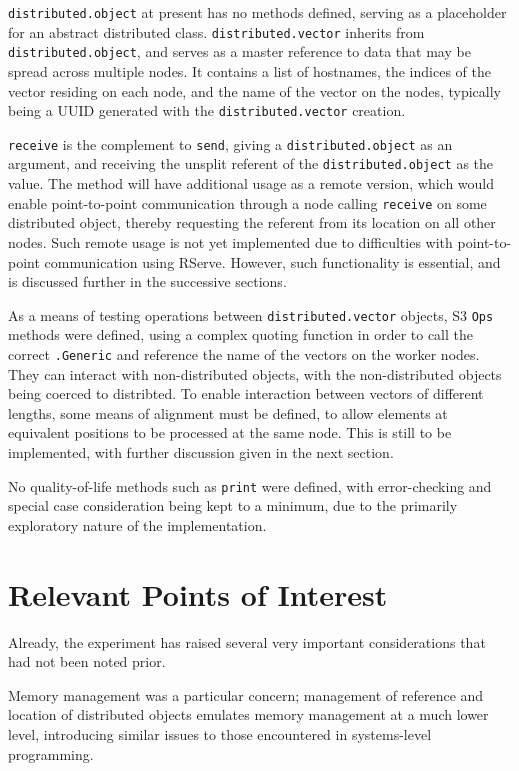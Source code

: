 \documentclass[a4paper,10pt]{article}
\begin{document}
\texttt{distributed.object} at present has no methods defined, serving as a
placeholder for an abstract distributed class.
\texttt{distributed.vector} inherits from \texttt{distributed.object}, and
serves as a master reference to data that may be spread across multiple nodes.
It contains a list of hostnames, the indices of the vector residing on each
node, and the name of the vector on the nodes, typically being a UUID generated
with the \texttt{distributed.vector} creation.

\texttt{receive} is the complement to \texttt{send}, giving a
\texttt{distributed.object} as an argument, and receiving the unsplit referent
of the \texttt{distributed.object} as the value.
The method will have additional usage as a remote version, which would enable
point-to-point communication through a node calling \texttt{receive} on some distributed
object, thereby requesting the referent from its location on all other nodes.
Such remote usage is not yet implemented due to difficulties with
point-to-point communication using RServe.
However, such functionality is essential, and is discussed further in the
successive sections.

As a means of testing operations between \texttt{distributed.vector} objects,
S3 \texttt{Ops} methods were defined, using a complex quoting function in order
to call the correct \texttt{.Generic} and reference the name of the vectors on
the worker nodes.
They can interact with non-distributed objects, with the non-distributed
objects being coerced to distribted.
To enable interaction between vectors of different lengths, some means of
alignment must be defined, to allow elements at equivalent positions to be
processed at the same node.
This is still to be implemented, with further discussion given in the next
section.

No quality-of-life methods such as \texttt{print} were defined, with error-checking
and special case consideration being kept to a minimum, due to the primarily
exploratory nature of the implementation.

\section{Relevant Points of Interest}

Already, the experiment has raised several very important considerations that
had not been noted prior.

Memory management was a particular concern; 
management of reference and location of distributed objects emulates memory
management at a much lower level, introducing similar issues to those
encountered in systems-level programming.
\end{document}
